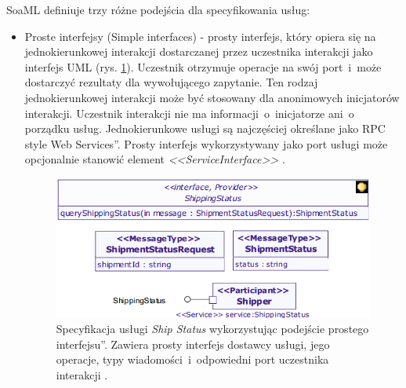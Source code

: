 SoaML definiuje trzy różne podejścia dla specyfikowania usług: 
\begin{itemize}
\item{Proste interfejsy (Simple interfaces) - prosty interfejs, który opiera się na jednokierunkowej interakcji dostarczanej przez uczestnika interakcji jako interfejs UML (rys. \ref{simple_interface_based_approach}). Uczestnik otrzymuje operacje na swój port~i~może dostarczyć rezultaty dla wywołującego zapytanie. Ten rodzaj jednokierunkowej interakcji może być stosowany dla anonimowych inicjatorów interakcji. Uczestnik interakcji nie ma informacji~o~inicjatorze ani~o~ porządku usług. Jednokierunkowe usługi są najczęściej określane jako \quotedblbase RPC style Web Services\textquotedblright. Prosty interfejs wykorzystywany jako port usługi może opcjonalnie stanowić element \emph{<<ServiceInterface>>} \cite{SOAMLOMG}.
\begin{figure}[h!tbp]
\begin{centering}
\includegraphics[width=11cm]{img/simple_interface_based_approach.png}
\caption[Specyfikacja usługi \quotedblbase Ship Status\textquotedblright wykorzystując podejście \quotedblbase prostego interfejsu\textquotedblright. Zawiera prosty interfejs dostawcy usługi, jego operacje, typy wiadomości~i~odpowiedni port uczestnika interakcji.]{Specyfikacja usługi \emph{Ship Status} wykorzystując podejście \quotedblbase prostego interfejsu\textquotedblright. Zawiera prosty interfejs dostawcy usługi, jego operacje, typy wiadomości~i~odpowiedni port uczestnika interakcji \cite{SoaMLErvBase}.}\label{simple_interface_based_approach}
\end{centering}
\end{figure}
} 


\end{itemize}
